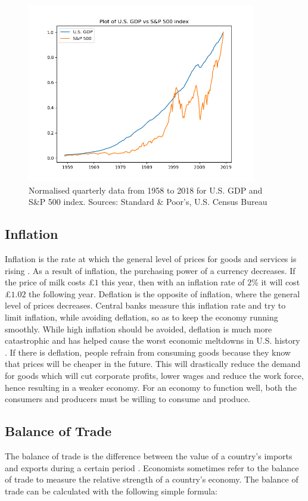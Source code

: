 \documentclass{UoYCSproject}
\begin{document}
\begin{figure}[h]
\includegraphics[width=10cm]{GDPvsSP500}
\centering
\caption{Normalised quarterly data from 1958 to 2018 for U.S. GDP and S\&P 500 index. Sources: Standard \& Poor's, U.S. Census Bureau} 
\label{fig:gdpvssp500}
\end{figure}

\subsection{Inflation}
Inflation is the rate at which the general level of prices for goods and services is rising \cite{inflation}. As a result of inflation, the purchasing power of a currency decreases. If the price of milk costs \pounds $1$ this year, then with an inflation rate of $2$\% it will cost \pounds $1.02$ the following year. Deflation is the opposite of inflation, where the general level of prices decreases. Central banks measure this inflation rate and try to limit inflation, while avoiding deflation, so as to keep the economy running smoothly. While high inflation should be avoided, deflation is much more catastrophic and has helped cause the worst economic meltdowns in U.S. history \cite{fleckenstein2013deflation}. If there is deflation, people refrain from consuming goods because they know that prices will be cheaper in the future. This will drastically reduce the demand for goods which will cut corporate profits, lower wages and reduce the work force, hence resulting in a weaker economy. For an economy to function well, both the consumers and producers must be willing to consume and produce. 

\subsection{Balance of Trade}
The balance of trade is the difference between the value of a country's imports and exports during a certain period \cite{balanceoftrade}. Economists sometimes refer to the balance of trade to measure the relative strength of a country's economy. The balance of trade can be calculated with the following simple formula:
\end{document}
